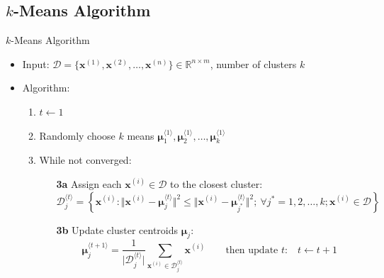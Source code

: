 \subsection{$k$-Means Algorithm}

\begin{frame}{$k$-Means Algorithm}{}\important
	\vspace*{2mm}
	\begin{itemize}
		\item Input: $\mathcal{D} = \{ \bm{x}^{(1)}, \bm{x}^{(2)}, \dots, \bm{x}^{(n)} \} \in \mathbb{R}^{n \times m}$,
			number of clusters $k$	
		\item Algorithm:
		\begin{enumerate}
			\item $t \longleftarrow 1$
			\item Randomly choose $k$ means $\bm{\mu}_1^{\langle 1 \rangle}, \bm{\mu}_2^{\langle 1 \rangle}, \dots, \bm{\mu}_k^{\langle 1 \rangle}$ 
			\item While not converged:
			\begin{itemize}
				\item[\textbf{3a}] Assign each $\bm{x}^{(i)} \in \mathcal{D}$ to the closest cluster:
				{\footnotesize
				\begin{equation*}
					\mathcal{D}_j^{\langle t \rangle}
						= \left\{
							\bm{x}^{(i)} : \Vert \bm{x}^{(i)} - \bm{\mu}_j^{\langle t \rangle} \Vert^2 \le
							\Vert \bm{x}^{(i)} - \bm{\mu}_{j^*}^{\langle t \rangle} \Vert^2;\
							\forall j^* = 1, 2, \dots, k; \bm{x}^{(i)} \in \mathcal{D}
						\right\}
				\end{equation*}}
				\item[\textbf{3b}] Update cluster centroids $\bm{\mu}_j$:
				{\footnotesize
				\begin{equation*}
					\bm{\mu}_{j}^{\langle t+1 \rangle} =
						\frac{1}{\vert \mathcal{D}_j^{\langle t \rangle} \vert} \sum_{\bm{x}^{(i)} \in \mathcal{D}_j^{\langle t \rangle}} \bm{x}^{(i)}
					\qquad\text{then update $t$:}\quad t \longleftarrow t + 1
				\end{equation*}}
			\end{itemize}
		\end{enumerate}
	\end{itemize}
\end{frame}


